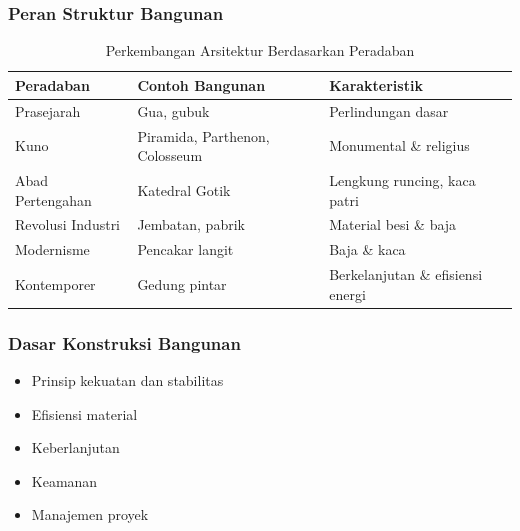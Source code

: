 \documentclass[../main.tex]{subfiles}
\begin{document}
\begin{frame}[t,mycolor=digiPH_leaf,mytitle=standard,dark]
	\frametitle{Peran Struktur Bangunan}

\end{frame}

\begin{frame}[c,mycolor=digiPH_white,mytitle=standard,light]

	\begin{table}[h]
		\centering
		\caption{Perkembangan Arsitektur Berdasarkan Peradaban}
		\begin{tabular}{|l|p{3cm}|p{3cm}|}
			\hline
			Peradaban          &  Contoh Bangunan                 &  Karakteristik  \\
			\hline
			Prasejarah         &  Gua, gubuk                      &  Perlindungan dasar  \\
			Kuno               &  Piramida, Parthenon, Colosseum  &  Monumental \& religius  \\
			Abad Pertengahan   &  Katedral Gotik                  &  Lengkung runcing, kaca patri  \\
			Revolusi Industri  &  Jembatan, pabrik                &  Material besi \& baja  \\
			Modernisme         &  Pencakar langit                 &  Baja \& kaca  \\
			Kontemporer        &  Gedung pintar                   &  Berkelanjutan \& efisiensi energi  \\
			\hline
		\end{tabular}
	\end{table}
\end{frame}


\begin{frame}[t,mycolor=digiPH_ocean,mytitle=center,dark]
	\frametitle{Dasar Konstruksi Bangunan}
	\begin{itemize}
		\item Prinsip kekuatan dan stabilitas
		\item Efisiensi material
		\item Keberlanjutan
		\item Keamanan
		\item Manajemen proyek
	\end{itemize}
\end{frame}
\end{document}
